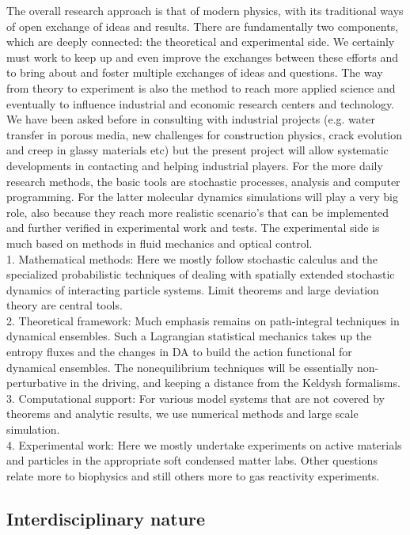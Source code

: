 The overall research approach is that of modern physics, with its traditional ways of open exchange of ideas and results.  There are fundamentally two components, which are deeply connected: the theoretical and experimental side.
We certainly must work to keep up and even improve the exchanges between these efforts and to bring about and foster multiple exchanges of ideas and questions.  The way from theory to experiment is also the method to reach more applied science and eventually to influence industrial and economic research centers and technology.  We have been asked before in consulting with industrial projects (e.g. water transfer in porous media, new challenges for construction physics, crack evolution and creep in glassy materials etc) but the present project will allow systematic developments in contacting and helping industrial players.
For the more daily research methods, the basic tools are stochastic processes, analysis and computer programming.  For the latter molecular dynamics simulations will play a very big role, also because they reach more realistic scenario's that can be implemented and further verified in experimental work and tests.  The experimental side is much based on methods in fluid mechanics and optical control.\\

1. Mathematical methods: Here we mostly follow stochastic calculus and the specialized probabilistic techniques of dealing with spatially extended stochastic dynamics of interacting particle systems. Limit theorems and large deviation theory are central tools.\\
2. Theoretical framework:  Much emphasis remains on path-integral techniques in dynamical ensembles.  Such a Lagrangian statistical mechanics takes up the entropy fluxes and the changes in DA to build the action functional for dynamical ensembles.  The nonequilibrium techniques will be essentially non-perturbative in the driving, and keeping a distance from the Keldysh formalisms.\\
3. Computational support: For various model systems that are not covered by theorems and analytic results, we use numerical methods and large scale simulation.\\
4. Experimental work: Here we mostly undertake experiments on active materials and particles in the appropriate soft condensed matter labs.  Other questions relate more to biophysics and still others more to gas reactivity experiments.

\subsection{Interdisciplinary nature}\label{sec:interdisc}

